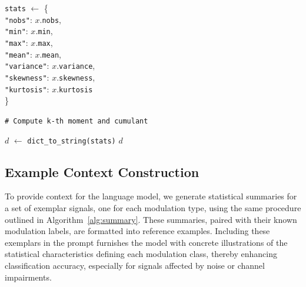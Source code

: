\begin{algorithm}
    \caption{Signal Summarization}\label{alg:summary}
    
    \small %
    
    \BlankLine
    \texttt{stats} $\gets$ \{ \\
    \quad \texttt{"nobs"}: $x$.\texttt{nobs},\\
    \quad \texttt{"min"}: $x$.\texttt{min},\\
    \quad \texttt{"max"}: $x$.\texttt{max},\\
    \quad \texttt{"mean"}: $x$.\texttt{mean},\\
    \quad \texttt{"variance"}: $x$.\texttt{variance},\\
    \quad \texttt{"skewness"}: $x$.\texttt{skewness},\\
    \quad \texttt{"kurtosis"}: $x$.\texttt{kurtosis} \\
    \}\;
    \BlankLine
    
    \texttt{\# Compute k-th moment and cumulant} \\
    \BlankLine
    
    \BlankLine
    
    \BlankLine
    
    $d$ $\gets$ \texttt{dict\_to\_string(stats)}\;
    \Return $d$\;
\end{algorithm}

\subsection{Example Context Construction}
To provide context for the language model, we generate statistical summaries for a set of exemplar signals, one for each modulation type, using the same procedure outlined in Algorithm~\ref{alg:summary}. These summaries, paired with their known modulation labels, are formatted into reference examples. Including these exemplars in the prompt furnishes the model with concrete illustrations of the statistical characteristics defining each modulation class, thereby enhancing classification accuracy, especially for signals affected by noise or channel impairments.

